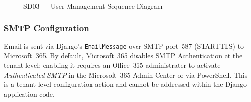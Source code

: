 \begin{sloppypar}
\begin{figure}[H]
  \centering
  \caption{SD03 --- User Management Sequence Diagram}
  \label{fig:sd03_user}
\end{figure}

\subsubsection{SMTP Configuration}

Email is sent via Django's \texttt{EmailMessage} over SMTP port~587
(STARTTLS) to Microsoft~365. By default, Microsoft~365 disables SMTP
Authentication at the tenant level; enabling it requires an Office~365
administrator to activate \textit{Authenticated SMTP} in the Microsoft~365
Admin Center or via PowerShell. This is a tenant-level configuration action
and cannot be addressed within the Django application code.

\end{sloppypar}

